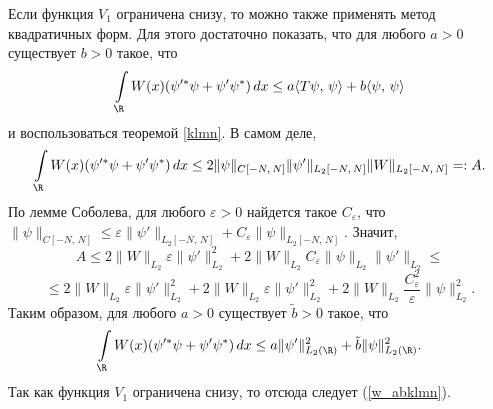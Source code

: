 \documentclass[a4paper
]{article}
\begin{document}
Если функция $V_1$ ограничена снизу, то можно также применять метод
квадратичных форм. Для этого достаточно показать, что для любого $a>0$
существует $b>0$ такое, что
\begin{align}
\label{w_abklmn}
\int \limits _\R W(x)(\psi '^*\psi +\psi '\psi ^*)\, dx\le a\langle T\psi ,
\, \psi\rangle +b\langle \psi , \, \psi \rangle
\end{align}
и воспользоваться теоремой \ref{klmn}. В самом деле,
$$\int \limits_\R W(x)(\psi'^*\psi+\psi'\psi^*)\, dx\le 2\|\psi\|
_{C[-N, \, N]}\|\psi'\|_{L_2[-N, \, N]}\|W\|_{L_2[-N, \, N]}=:A.$$
По лемме Соболева, для любого $\varepsilon>0$ найдется такое $C
_\varepsilon$, что $\|\psi\|_{C[-N, \, N]}\le \varepsilon \|\psi'\|
_{L_2[-N, \, N]}+C_\varepsilon\|\psi\|_{L_2[-N, \, N]}$. Значит,
$$A\le 2\|W\|_{L_2}\varepsilon \|\psi'\|^2_{L_2}+2\|W\|_{L_2}C_\varepsilon
\|\psi\|_{L_2}\|\psi'\|_{L_2}\le$$ $$\le 2\|W\|_{L_2}\varepsilon
\|\psi'\|^2_{L_2}+2\|W\|_{L_2}\varepsilon\|\psi'\|^2_{L_2}+2\|W\|_{L_2}
\frac{C_\varepsilon^2}{\varepsilon}\|\psi\|^2_{L_2}.$$ Таким образом,
для любого $a>0$ существует $\tilde b>0$ такое, что
\begin{align}
\label{w_acklmn}
\int \limits _\R W(x)(\psi '^*\psi +\psi '\psi ^*)\, dx\le a\|\psi '\| ^2_{L_2(\R)}+
\tilde b\| \psi\| ^2_{L_2(\R)}.
\end{align}
Так как функция $V_1$ ограничена снизу, то отсюда следует (\ref{w_abklmn}).
\end{document}
